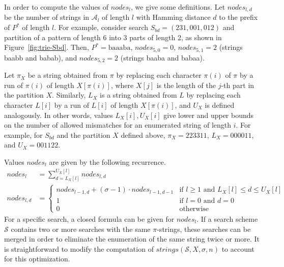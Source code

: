 \documentclass[12pt]{article}
\newcommand{\scheme}{\mathcal{S}}
\newcommand{\partition}{X}
\newcommand{\numstrings}{\mathit{strings}}
\newcommand{\strings}{\mathcal{A}}
\newcommand{\numnodes}[1]{\mathit{nodes}_{#1}}
\newcommand{\numnodesd}[2]{\mathit{nodes}_{#1,#2}}
\newcommand{\Psearch}{P^*}
\begin{document}
In order to compute the values of $\numnodes{l}$, we give some definitions.
Let $\numnodesd{l}{d}$ be the number of strings in $\strings_l$
of length $l$ with Hamming distance $d$ to the prefix of $\Psearch$
of length $l$.
For example, consider search $S_{bd} = (231,001,012)$ and partition of 
a pattern of length 6 into 3 parts of length 2,
as shown in Figure~\ref{fig:trie-Sbd}.
Then, $\Psearch = \mathrm{baaaba}$, $\numnodesd{5}{0} = 0$,
$\numnodesd{5}{1} = 2$ (strings baabb and babab),
and $\numnodesd{5}{2} = 2$ (strings baaba and babaa).

Let $\pi_{\partition}$ be a string obtained from $\pi$ by replacing each
character $\pi(i)$ of $\pi$ by a run of $\pi(i)$ of length
$\partition[{\pi(i)}]$,
where $\partition[j]$ is the length of the $j$-th part in the partition
$\partition$.
Similarly, $L_{\partition}$ is a string obtained from
$L$ by replacing each character $L[i]$  by a run of $L[i]$ of length
$\partition[{\pi(i)}]$, and $U_{\partition}$ is defined analogously.
In other words, values $L_{\partition}[i],U_{\partition}[i]$
give lower and upper bounds on the number of allowed mismatches for an
enumerated string of length $i$.
For example, for $S_{bd}$ and the partition $\partition$ defined above,
$\pi_{\partition} = 223311$, $L_{\partition} = 000011$,
and $U_{\partition} = 001122$.

Values $\numnodes{l}$ are given by the following recurrence.
\begin{align}\label{eqn:nl}
\numnodes{l}  & = 
 \sum_{d = L_{\partition}[l]}^{U_{\partition}[l]} \numnodesd{l}{d}\\
\numnodesd{l}{d} & = \begin{cases}
\numnodesd{l-1}{d} + (\sigma-1) \cdot\numnodesd{l-1}{d-1} & 
\text{if $l \geq 1$ and $L_{\partition}[l] \leq d \leq U_{\partition}[l]$} \\
1 & \text{if $l = 0$ and $d = 0$}\\
0 & \text{otherwise}
\end{cases}
\end{align}
For a specific search, a closed formula can be given for $\numnodes{l}$.
If a search scheme $\scheme$ contains two or more searches with the same
$\pi$-strings, these searches can be merged in order to eliminate the
enumeration of the same string twice or more.
It is straightforward to modify the computation of $\numstrings(\scheme,\partition,\sigma,n)$ to account for this optimization.
\end{document}
